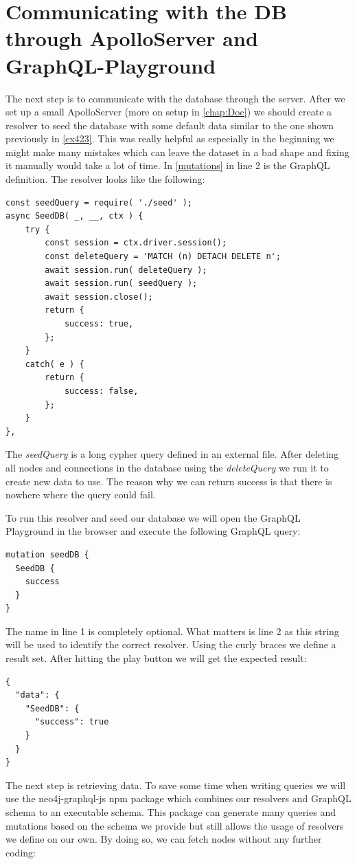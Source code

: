 \section{Communicating with the DB through ApolloServer and GraphQL-Playground}
The next step is to communicate with the database through the server. After we set up a small ApolloServer (more on setup in \autoref{chap:Doc}) we should create a resolver to seed the database with some default data similar to the one shown previously in \autoref{ex423}. This was really helpful as especially in the beginning we might make many mistakes which can leave the dataset in a bad shape and fixing it manually would take a lot of time. In \autoref{mutations} in line 2 is the GraphQL definition. The resolver looks like the following:
\lstset{language=JavaScript}
\begin{lstlisting}[caption={Seed Resolver}]
const seedQuery = require( './seed' );
async SeedDB( _, __, ctx ) {
	try {
		const session = ctx.driver.session();
		const deleteQuery = 'MATCH (n) DETACH DELETE n';
		await session.run( deleteQuery );
		await session.run( seedQuery );
		await session.close();
		return {
			success: true,
		};
	}
	catch( e ) {
		return {
			success: false,
		};	
	}
},
\end{lstlisting}

The \emph{seedQuery} is a long cypher query defined in an external file. After deleting all nodes and connections in the database using the \emph{deleteQuery} we run it to create new data to use. The reason why we can return success is that there is nowhere where the query could fail.

To run this resolver and seed our database we will open the GraphQL Playground in the browser and execute the following GraphQL query:
\lstset{language=GraphQL}
\begin{lstlisting}[caption={Seeding the DB through GraphQL Playground}, label={exSeed}]
mutation seedDB {
  SeedDB {
    success
  }
}
\end{lstlisting}
The name in line 1 is completely optional. What matters is line 2 as this string will be used to identify the correct resolver. Using the curly braces we define a result set. After hitting the play button we will get the expected result:
\begin{lstlisting}[caption={Seeding Result}, label={exResSeed}]
{
  "data": {
    "SeedDB": {
      "success": true
    }
  }
}
\end{lstlisting}

The next step is retrieving data. To save some time when writing queries we will use the neo4j-graphql-js npm package which combines our resolvers and GraphQL schema to an executable schema. This package can generate many queries and mutations based on the schema we provide but still allows the usage of resolvers we define on our own.
By doing so, we can fetch nodes without any further coding:

